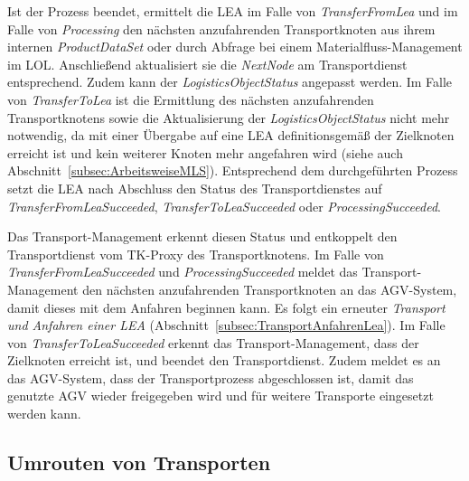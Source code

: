 Ist der Prozess beendet, ermittelt die LEA im Falle von \emph{TransferFromLea} und im Falle von \emph{Processing} den nächsten anzufahrenden Transportknoten aus ihrem internen \emph{ProductDataSet} oder durch Abfrage bei einem Materialfluss-Management im LOL. Anschließend aktualisiert sie die \emph{NextNode} am Transportdienst entsprechend. Zudem kann der \emph{LogisticsObjectStatus} angepasst werden. Im Falle von \emph{TransferToLea} ist die Ermittlung des nächsten anzufahrenden Transportknotens sowie die Aktualisierung der \emph{LogisticsObjectStatus} nicht mehr notwendig, da mit einer Übergabe auf eine LEA definitionsgemäß der Zielknoten erreicht ist und kein weiterer Knoten mehr angefahren wird (siehe auch Abschnitt~\ref{subsec:ArbeitsweiseMLS}). Entsprechend dem durchgeführten Prozess setzt die LEA nach Abschluss den Status des Transportdienstes auf \emph{TransferFromLeaSucceeded}, \emph{TransferToLeaSucceeded} oder \emph{ProcessingSucceeded}.

Das Transport-Management erkennt diesen Status und entkoppelt den Transportdienst vom TK-Proxy des Transportknotens. Im Falle von \emph{TransferFromLeaSucceeded} und \emph{ProcessingSucceeded} meldet das Transport-Management den nächsten anzufahrenden Transportknoten an das AGV-System, damit dieses mit dem Anfahren beginnen kann. Es folgt ein erneuter \emph{Transport und Anfahren einer LEA} (Abschnitt~\ref{subsec:TransportAnfahrenLea}). Im Falle von \emph{TransferToLeaSucceeded} erkennt das Transport-Management, dass der Zielknoten erreicht ist, und beendet den Transportdienst. Zudem meldet es an das AGV-System, dass der Transportprozess abgeschlossen ist, damit das genutzte AGV wieder freigegeben wird und für weitere Transporte eingesetzt werden kann.

\subsection{Umrouten von Transporten}
\label{subsec:Rerouting}

